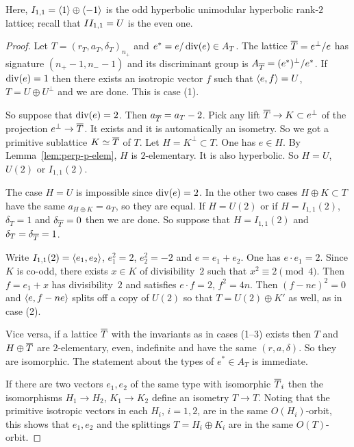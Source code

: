 \documentclass{amsart}
\begin{document}
Here, $I_{1,1}=\langle 1\rangle \oplus\langle -1\rangle$ is the odd hyperbolic
unimodular hyperbolic rank-$2$ lattice; recall that $II_{1,1}=U$ is
the even one.

\begin{proof}
  Let $T = (r_T,a_T,\delta_T)_{n_+}$ and $e^* = e/\operatorname{div}(e)\in A_T$. The
  lattice ${\overline T} = e^\perp/e$ has signature $(n_+-1,n_--1)$
  and its discriminant group is $A_{\overline T} = (e^*)^\perp/e^*$. If
  $\operatorname{div}(e)=1$ then there exists an isotropic vector $f$ such that $\langle
  e, f\rangle = U$, $T=U\oplus U^\perp$ and we are done. This is case (1).

  So suppose that $\operatorname{div}(e)=2$. Then $a_{\overline T}=a_T-2$. Pick any lift
  ${\overline T} \to K \subset e^\perp$ of the projection $e^\perp\to {\overline T}$. It
  exists and it is automatically an isometry. So we got a primitive
  sublattice $K\simeq{\overline T}$ of $T$. Let $H=K^\perp\subset T$. One has
  $e\in H$.  By Lemma~\ref{lem:perp-p-elem}, $H$ is $2$-elementary. It
  is also hyperbolic. So $H=U$, $U(2)$ or $I_{1,1}(2)$.
  
  The case $H=U$ is impossible since $\operatorname{div}(e)=2$.  In the other two
  cases $H\oplus K\subset T$ have the same $a_{H\oplus K}=a_T$, so they are equal.  If
  $H=U(2)$ or if $H=I_{1,1}(2)$, $\delta_T=1$ and $\delta_{\overline T}=0$ then we
  are done. So suppose that $H=I_{1,1}(2)$ and
  $\delta_T=\delta_{\overline T}=1$.

  Write $I_{1,1}(2) = \langle e_1, e_2\rangle$, $e_1^2=2$, $e_2^2=-2$ and
  $e=e_1+e_2$. One has $e\cdot e_1=2$. Since $K$ is co-odd, there exists
  $x\in K$ of divisibility~$2$ such that $x^2 \equiv 2\pmod 4$. Then
  $f = e_1 + x$ has divisibility~$2$ and satisfies $e\cdot f=2$, $f^2 = 4n$.
  Then $(f-ne)^2=0$ and $\langle e,f-ne\rangle$ splits off a copy of $U(2)$ so
  that $T = U(2)\oplus K'$ as well, as in case (2).

  Vice versa, if a lattice ${\overline T}$ with the invariants as in cases
  (1--3) exists then $T$ and $H\oplus {\overline T}$ are $2$-elementary, even,
  indefinite and have the same $(r,a,\delta)$. So they are isomorphic.
  The statement about the types of $e^*\in A_T$ is immediate.

  If there are two vectors $e_1,e_2$ of the same type with isomorphic
  ${\overline T}_i$ then the isomorphisms $H_1\to H_2$, $K_1\to K_2$ define an
  isometry $T\to T$. Noting that the primitive isotropic vectors in
  each $H_i$, $i=1,2$, are in the same $O(H_i)$-orbit, this shows that
  $e_1,e_2$ and the splittings $T=H_i\oplus K_i$ are in the same
  $O(T)$-orbit.
\end{proof}
\end{document}
